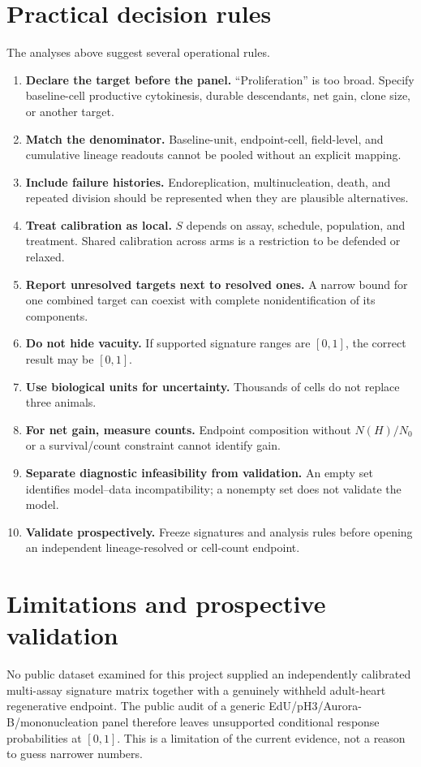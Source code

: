 \documentclass[11pt]{article}
\begin{document}
\section{Practical decision rules}
The analyses above suggest several operational rules.
\begin{enumerate}[leftmargin=*]
\item \textbf{Declare the target before the panel.} ``Proliferation'' is too broad. Specify baseline-cell productive cytokinesis, durable descendants, net gain, clone size, or another target.
\item \textbf{Match the denominator.} Baseline-unit, endpoint-cell, field-level, and cumulative lineage readouts cannot be pooled without an explicit mapping.
\item \textbf{Include failure histories.} Endoreplication, multinucleation, death, and repeated division should be represented when they are plausible alternatives.
\item \textbf{Treat calibration as local.} $S$ depends on assay, schedule, population, and treatment. Shared calibration across arms is a restriction to be defended or relaxed.
\item \textbf{Report unresolved targets next to resolved ones.} A narrow bound for one combined target can coexist with complete nonidentification of its components.
\item \textbf{Do not hide vacuity.} If supported signature ranges are $[0,1]$, the correct result may be $[0,1]$.
\item \textbf{Use biological units for uncertainty.} Thousands of cells do not replace three animals.
\item \textbf{For net gain, measure counts.} Endpoint composition without $N(H)/N_0$ or a survival/count constraint cannot identify gain.
\item \textbf{Separate diagnostic infeasibility from validation.} An empty set identifies model--data incompatibility; a nonempty set does not validate the model.
\item \textbf{Validate prospectively.} Freeze signatures and analysis rules before opening an independent lineage-resolved or cell-count endpoint.
\end{enumerate}

\section{Limitations and prospective validation}
No public dataset examined for this project supplied an independently calibrated multi-assay signature matrix together with a genuinely withheld adult-heart regenerative endpoint. The public audit of a generic EdU/pH3/Aurora-B/mononucleation panel therefore leaves unsupported conditional response probabilities at $[0,1]$. This is a limitation of the current evidence, not a reason to guess narrower numbers.
\end{document}
